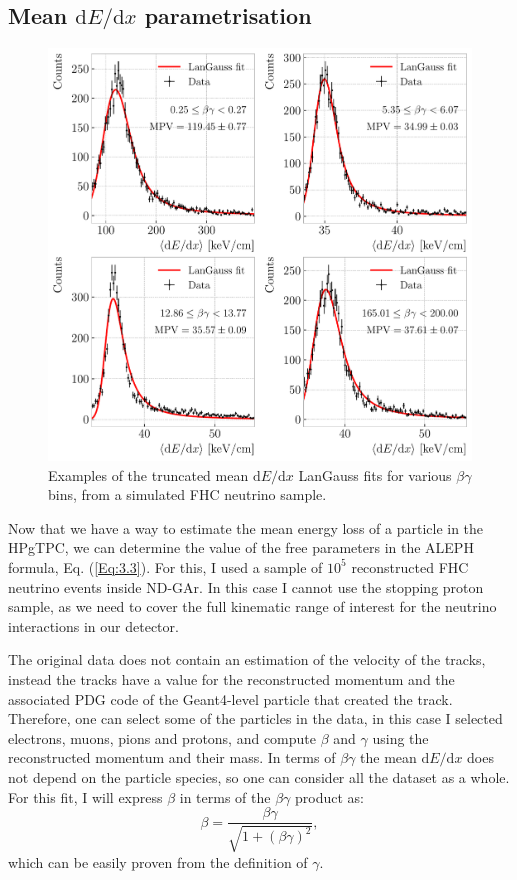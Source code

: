 \subsection[Mean \texorpdfstring{$\mathrm{d}E/\mathrm{d}x$}{dE/dx} parametrisation]{Mean \boldmath\texorpdfstring{$\mathrm{d}E/\mathrm{d}x$}{dE/dx} parametrisation}

\begin{figure}[t]
	\centering
	\includegraphics[width=.85\linewidth]{Images/GArSoft_PID/dEdx/dEdx_betagamma_examples.pdf}
	\caption{Examples of the truncated mean $\mathrm{d}E/\mathrm{d}x$ LanGauss fits for various $\beta\gamma$ bins, from a simulated FHC neutrino sample.}
	\label{fig:dEdx_betagamma_fits}
\end{figure}

Now that we have a way to estimate the mean energy loss of a particle in the HPgTPC, we can determine the value of the free parameters in the ALEPH formula, Eq. (\ref{Eq:3.3}). For this, I used a sample of $10^{5}$ reconstructed FHC neutrino events inside ND-GAr. In this case I cannot use the stopping proton sample, as we need to cover the full kinematic range of interest for the neutrino interactions in our detector.

The original data does not contain an estimation of the velocity of the tracks, instead the tracks have a value for the reconstructed momentum and the associated PDG code of the Geant4-level particle that created the track. Therefore, one can select some of the particles in the data, in this case I selected electrons, muons, pions and protons, and compute $\beta$ and $\gamma$ using the reconstructed momentum and their mass. In terms of $\beta\gamma$ the mean $\mathrm{d}E/\mathrm{d}x$ does not depend on the particle species, so one can consider all the dataset as a whole. For this fit, I will express $\beta$ in terms of the $\beta\gamma$ product as:
\begin{equation}
    \beta = \frac{\beta\gamma}{\sqrt{1+(\beta\gamma)^{2}}},
\end{equation}
which can be easily proven from the definition of $\gamma$.

